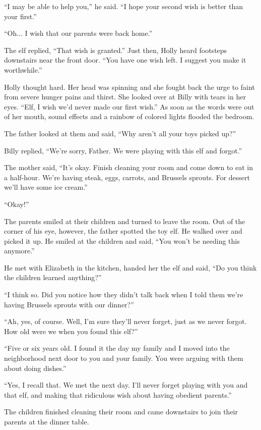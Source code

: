 “I may be able to help you,” he said. “I hope your second wish is better than your first.”

“Oh...  I wish that our parents were back home.”

The elf replied, “That wish is granted.” Just then, Holly heard footsteps downstairs near the front door. “You have one wish left. I suggest you make it worthwhile.”

Holly thought hard. Her head was spinning and she fought back the urge to faint from severe hunger pains and thirst. She looked over at Billy with tears in her eyes. “Elf, I wish we'd never made our first wish.” As soon as the words were out of her mouth, sound effects and a rainbow of colored lights flooded the bedroom.


The father looked at them and said, “Why aren't all your toys picked up?”

Billy replied, “We're sorry, Father. We were playing with this elf and forgot.”

The mother said, “It's okay. Finish cleaning your room and come down to eat in a half-hour. We're having steak, eggs, carrots, and Brussels sprouts. For dessert we'll have some ice cream.”

“Okay!”

The parents smiled at their children and turned to leave the room. Out of the corner of his eye, however, the father spotted the toy elf. He walked over and picked it up. He smiled at the children and said, “You won't be needing this anymore.”

He met with Elizabeth in the kitchen, handed her the elf and said, “Do you think the children learned anything?”

“I think so. Did you notice how they didn't talk back when I told them we're having Brussels sprouts with our dinner?”

“Ah, yes, of course. Well, I'm sure they'll never forget, just as we never forgot. How old were we when you found this elf?”

“Five or six years old. I found it the day my family and I moved into the neighborhood next door to you and your family. You were arguing with them about doing dishes.”

“Yes, I recall that. We met the next day.  I'll never forget playing with you and that elf, and making that ridiculous wish about having obedient parents.”

The children finished cleaning their room and came downstairs to join their parents at the dinner table.